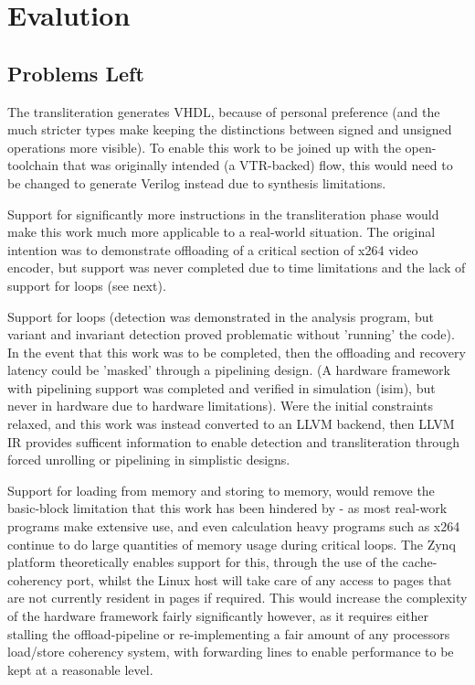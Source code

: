 \documentclass[a4paper]{article}
\begin{document}
\section{Evalution}
\subsection{Problems Left}
The transliteration generates VHDL, because of personal preference (and the much stricter types make keeping the distinctions between signed and unsigned operations more visible). To enable this work to be joined up with the open-toolchain that was originally intended (a VTR-backed) flow, this would need to be changed to generate Verilog instead due to synthesis limitations.

Support for significantly more instructions in the transliteration phase would make this work much more applicable to a real-world situation. The original intention was to demonstrate offloading of a critical section of x264 video encoder, but support was never completed due to time limitations and the lack of support for loops (see next).

Support for loops (detection was demonstrated in the analysis program, but variant and invariant detection proved problematic without 'running' the code). In the event that this work was to be completed, then the offloading and recovery latency could be 'masked' through a pipelining design. (A hardware framework with pipelining support was completed and verified in simulation (isim), but never in hardware due to hardware limitations). Were the initial constraints relaxed, and this work was instead converted to an LLVM backend, then LLVM IR provides sufficent information to enable detection and transliteration through forced unrolling or pipelining in simplistic designs.

Support for loading from memory and storing to memory, would remove the basic-block limitation that this work has been hindered by - as most real-work programs make extensive use, and even calculation heavy programs such as x264 continue to do large quantities of memory usage during critical loops. The Zynq platform theoretically enables support for this, through the use of the cache-coherency port, whilst the Linux host will take care of any access to pages that are not currently resident in pages if required. This would increase the complexity of the hardware framework fairly significantly however, as it requires either stalling the offload-pipeline or re-implementing a fair amount of any processors load/store coherency system, with forwarding lines to enable performance to be kept at a reasonable level.
\end{document}
